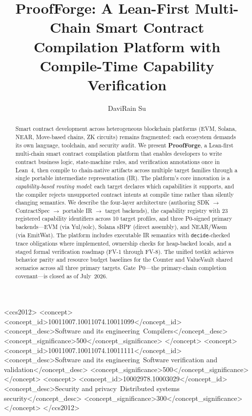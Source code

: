 \documentclass[sigconf]{acmart}
\begin{document}
\title{ProofForge: A Lean-First Multi-Chain Smart Contract\\Compilation Platform with Compile-Time Capability Verification}

\author{DaviRain Su}

\renewcommand{\shortauthors}{Su}

\begin{abstract}
Smart contract development across heterogeneous blockchain platforms (EVM, Solana, NEAR,
Move-based chains, ZK circuits) remains fragmented: each ecosystem demands its own language,
toolchain, and security audit. We present \textbf{ProofForge}, a Lean-first multi-chain smart
contract compilation platform that enables developers to write contract business logic,
state-machine rules, and verification annotations once in Lean~4, then compile to
chain-native artifacts across multiple target families through a single portable
intermediate representation (IR).
The platform's core innovation is a \emph{capability-based routing model}: each target declares
which capabilities it supports, and the compiler rejects unsupported contract intents at
compile time rather than silently changing semantics. We describe the four-layer architecture
(authoring SDK $\to$ ContractSpec $\to$ portable IR $\to$ target backends), the capability
registry with 23 registered capability identifiers across 10 target profiles, and three
P0-signed primary backends---EVM (via Yul/solc), Solana sBPF (direct assembly), and
NEAR/Wasm (via EmitWat). The platform includes executable IR semantics with
\texttt{decide}-checked trace obligations where implemented, ownership checks for
heap-backed locals, and a staged formal verification roadmap (FV-1 through FV-8).
The unified testkit achieves behavior parity and resource budget baselines for the
Counter and ValueVault shared scenarios across all three primary targets. Gate~P0---the
primary-chain completion covenant---is closed as of July~2026.
\end{abstract}

\begin{CCSXML}
<ccs2012>
 <concept>
  <concept_id>10011007.10011074.10011099</concept_id>
  <concept_desc>Software and its engineering~Compilers</concept_desc>
  <concept_significance>500</concept_significance>
 </concept>
 <concept>
  <concept_id>10011007.10011074.10011111</concept_id>
  <concept_desc>Software and its engineering~Software verification and validation</concept_desc>
  <concept_significance>500</concept_significance>
 </concept>
 <concept>
  <concept_id>10002978.10003029</concept_id>
  <concept_desc>Security and privacy~Distributed systems security</concept_desc>
  <concept_significance>300</concept_significance>
 </concept>
</ccs2012>
\end{CCSXML}
\end{document}
